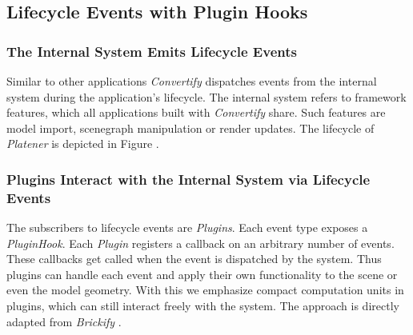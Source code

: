 \documentclass[../ClassicThesis.tex]{subfiles}
\begin{document}
\subsection{Lifecycle Events with Plugin Hooks}

\subsubsection{The Internal System Emits Lifecycle Events}

Similar to other applications \emph{Convertify}
dispatches events from the internal system during the application's lifecycle.
The internal system refers to framework features, which all applications built
with \emph{Convertify} share. Such features are model import, scenegraph
manipulation or render updates. The lifecycle of \emph{Platener} is depicted in
Figure .


\subsubsection{Plugins Interact with the Internal System via Lifecycle Events}

The subscribers to lifecycle events are \emph{Plugins}. Each event type exposes
a \emph{PluginHook}. Each \emph{Plugin} registers a callback on an arbitrary
number of events. These callbacks get called when the event is dispatched by the
system. Thus plugins can handle each event and apply their own functionality to
the scene or even the model geometry. With this we emphasize compact computation
units in plugins, which can still interact freely with the system. The approach
is directly adapted from \emph{Brickify} .

\end{document}
